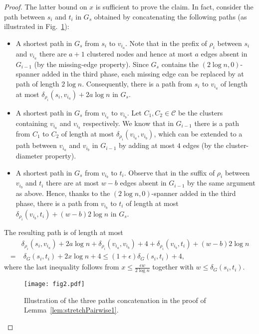 \documentclass[a4paper,11pt]{article}
\theoremstyle{definition}
\newcommand{\dist}{\delta}
\newcommand{\cC}{\mathcal{C}}
\begin{document}
\begin{proof}
The latter bound on $x$ is sufficient to prove the claim. In fact, consider the path between $s_i$ and $t_i$ in $G_s$ obtained by concatenating the following paths
(as illustrated in Fig.~\ref{fig2}):
\begin{itemize}
  \item A shortest path in $G_s$ from $s_i$ to $v_{i_a}$. Note that in the prefix of $\rho_i$ between $s_i$ and $v_{i_a}$ there
  are $a+1$ clustered nodes and hence at most $a$ edges absent in $G_{i-1}$ (by the missing-edge property). Since $G_s$ contains the $(2\log n,0)$-spanner added in the third phase, each missing edge can be replaced by at path of length $2\log n$. Consequently, there is a path from $s_i$ to $v_{i_a}$ of length at most $\dist_{\rho_i}(s_i,v_{i_a})+2a\log n$ in $G_s$.
  \item A shortest path in $G_s$ from $v_{i_a}$ to $v_{i_b}$. Let $C_1, C_2 \in \cC$ be the clusters containing $v_{i_a}$ and $v_{i_b}$ respectively.
  We know that in $G_{i-1}$ there is a path from $C_1$ to $C_2$ of length at most $\dist_{\rho_i}(v_{i_a},v_{i_b})$,
  which can be extended to a path between $v_{i_a}$ and $v_{i_b}$ in $G_{i-1}$ by adding at most $4$ edges
  (by the cluster-diameter property).
  \item A shortest path in $G_s$ from $v_{i_b}$ to $t_i$. Observe that in the suffix of $\rho_i$ between $v_{i_b}$ and $t_i$
  there are at most $w-b$ edges absent in $G_{i-1}$ by the same argument as above. Hence, thanks to the $(2\log n,0)$-spanner added in the third phase, there is a path from $v_{i_b}$ to $t_i$ of length at most $\dist_{\rho_i}(v_{i_b},t_i)+(w-b)2\log n$ in $G_s$.
\end{itemize}
The resulting path is of length at most 
\begin{align*}
& \dist_{\rho_i}(s_i,v_{i_a})+2a\log n+\dist_{\rho_i}(v_{i_a},v_{i_b})+4+\dist_{\rho_i}(v_{i_b},t_i)+(w-b)2\log n \\
 = & \;
\dist_G(s_i,t_i)+2x\log n+4 \le (1+\epsilon)\dist_G(s_i,t_i)+4,
\end{align*} 
where the last inequality
follows from $x \le \frac{\epsilon w}{2 \log n}$ together with $w \le \dist_G(s_i,t_i)$.
\begin{figure}[t]
\begin{center}
\texttt{[image: fig2.pdf]}
\end{center}
\caption{Illustration of the three paths concatenation in the proof of Lemma~\ref{lem:stretchPairwise1}.}
\label{fig2}
\end{figure}
\end{proof}
\end{document}
